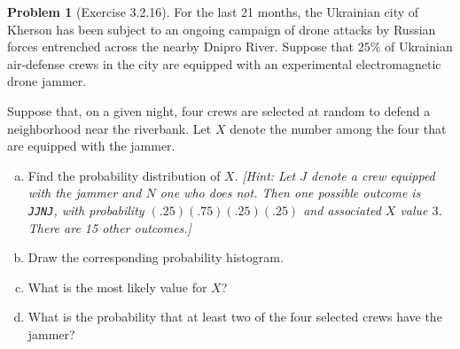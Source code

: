 \documentclass[10pt]{article}
\theoremstyle{definition}
\newtheorem{problem}[theorem]{Problem}
\newcommand{\1}[1]{\textbf{1}_{\left[#1\right]}} %
\begin{document}
\begin{problem}[Exercise 3.2.16]
  For the last 21 months, the Ukrainian city of Kherson has been subject to an
  ongoing campaign of drone attacks by Russian forces entrenched across the
  nearby Dnipro River. Suppose that $25\%$ of Ukrainian air-defense crews in
  the city are equipped with an experimental electromagnetic drone jammer.

  Suppose that, on a given night, four crews are selected at random to defend
  a neighborhood near the riverbank. Let $X$ denote the number among the four
  that are equipped with the jammer.

  \begin{enumerate}[(a)]
    \item Find the probability distribution of $X$. \textit{[Hint: Let $J$
    denote a crew equipped with the jammer and $N$ one who does not. Then one
    possible outcome is \texttt{JJNJ}, with probability $(.25)(.75)(.25)(.25)$
    and associated $X$ value $3$. There are 15 other outcomes.]}
    \item Draw the corresponding probability histogram.
    \item What is the most likely value for $X$?
    \item What is the probability that at least two of the four selected crews
    have the jammer?
  \end{enumerate}
\end{problem}
\end{document}
